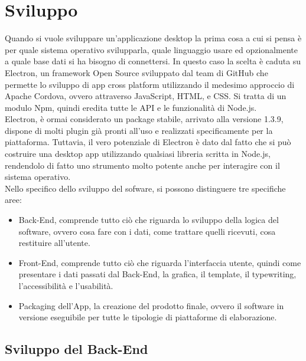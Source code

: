 
\chapter{Sviluppo}

Quando si vuole sviluppare un’applicazione desktop la prima cosa a cui si pensa è per quale sistema operativo svilupparla, quale linguaggio usare ed opzionalmente a quale base dati si ha bisogno di connettersi.
In questo caso la scelta è caduta su Electron, un framework Open Source sviluppato dal team di GitHub che permette lo sviluppo di app cross platform utilizzando il medesimo approccio di Apache Cordova, ovvero attraverso JavaScript, HTML, e CSS.
Si tratta di un modulo Npm, quindi eredita tutte le API e le funzionalità di Node.js.
\\
Electron, è ormai considerato un package stabile, arrivato alla versione 1.3.9, dispone di molti plugin già pronti all’uso e realizzati specificamente per la piattaforma. Tuttavia, il vero potenziale di Electron è dato dal fatto che si può costruire una desktop app utilizzando qualsiasi libreria scritta in Node.js, rendendolo di fatto uno strumento molto potente anche per interagire con il sistema operativo.
\\
Nello specifico dello sviluppo del sofware, si possono distinguere tre specifiche aree:
\begin{itemize}
	\item Back-End, comprende tutto ciò che riguarda lo sviluppo della logica del software, ovvero cosa fare con i dati, come trattare quelli ricevuti, cosa restituire all'utente.
	\item Front-End, comprende tutto ciò che riguarda l'interfaccia utente, quindi come presentare i dati passati dal Back-End, la grafica, il template, il typewriting, l’accessibilità e l’usabilità.
	\item Packaging dell'App, la creazione del prodotto finale, ovvero il software in versione eseguibile per tutte le tipologie di piattaforme di elaborazione.
\end{itemize}



\section{Sviluppo del Back-End}

